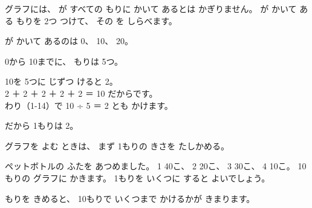 
\noindent グラフには、 が すべての もりに かいて あるとは かぎりません。
が かいて ある もりを 2つ つけて、 その を しらべます。

\par\vspace{3pt}
\noindent\begin{minipage}[c]{0.36\linewidth}\centering
{}
\end{minipage}\hfill
\begin{minipage}[c]{0.62\linewidth}
\begin{enumerate}[label={\bkcircled[bkTheme]{\arabic*}}, leftmargin=2\zw, itemsep=0pt, topsep=0pt]
\item {}が かいて あるのは 0、 10、 20。
\item 0から 10までに、 もりは 5つ。
\item 10を 5つに じずつ けると 2。\\
2 ＋ 2 ＋ 2 ＋ 2 ＋ 2 ＝ 10 だからです。\\
わり（1-14）で 10 ÷ 5 ＝ 2 とも かけます。
\item だから 1もりは 2。
\end{enumerate}
\end{minipage}

\begin{taisetsu}
グラフを よむ ときは、 まず 1もりの きさを たしかめる。
\end{taisetsu}


\label{bk:1-17:kimeru}ペットボトルの ふたを あつめました。 1 40こ、 2 20こ、 3 30こ、 4 10こ。
10もりの グラフに かきます。 1もりを いくつに すると よいでしょう。

\par\vspace{3pt}
もりを きめると、 10もりで いくつまで かけるかが きまります。

